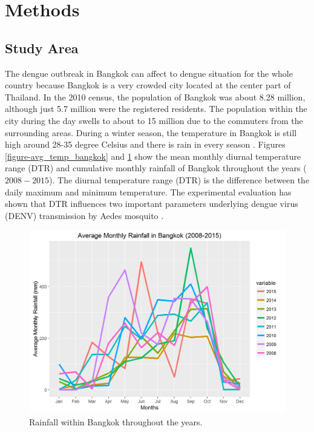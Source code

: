 \documentclass{bmcart}
\begin{document}
%




\section{Methods}



\subsection{Study Area}


The dengue outbreak in Bangkok can affect to dengue situation for the whole country because Bangkok is a very crowded city located at the center part of Thailand. In the 2010 census, the population of Bangkok was about 8.28 million, although just 5.7 million were the registered residents. The population within the city during the day swells to about to 15 million \cite{WPR2015} due to the commuters from the surrounding areas. During a winter season, the temperature in Bangkok is still high around 28-35 degree Celsius and there is rain in every season \cite{wwo2012}. Figures \ref{figure-avg_temp_bangkok} and \ref{figure-avg_rain_bangkok} show the mean monthly diurnal temperature range (DTR) and cumulative monthly rainfall of Bangkok throughout the years ($2008-2015$).  The diurnal temperature range (DTR) is the difference between the daily maximum and minimum temperature. The experimental evaluation has shown that DTR influences two important parameters underlying dengue virus (DENV) transmission by Aedes mosquito \cite{lambrechts2011impact}. 


\begin{figure}[htbp]
	\begin{center}
		\includegraphics[width= 1.0\textwidth]{1-AvgMonthlyRainfall}
		\caption{Rainfall within Bangkok throughout the years.}
		\label{figure-avg_rain_bangkok}
	\end{center}
\end{figure}
\end{document}

